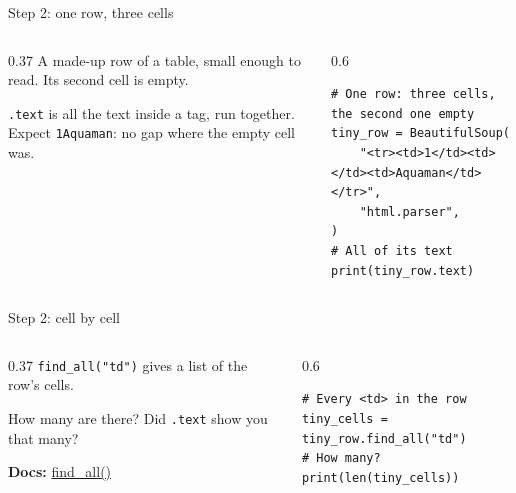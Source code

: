\documentclass[9pt,aspectratio=169]{beamer}
\begin{document}
\begin{frame}[fragile]{Step 2: one row, three cells}
    \begin{columns}[T]
        \begin{column}{0.37\textwidth}
            A made-up row of a table, small enough to read. Its second cell is empty.

            \medskip
            \texttt{.text} is all the text inside a tag, run together. Expect \texttt{1Aquaman}: no gap where the empty cell was.
        \end{column}
        \begin{column}{0.6\textwidth}
\begin{lstlisting}
# One row: three cells, the second one empty
tiny_row = BeautifulSoup(
    "<tr><td>1</td><td></td><td>Aquaman</td></tr>",
    "html.parser",
)
# All of its text
print(tiny_row.text)
\end{lstlisting}
        \end{column}
    \end{columns}
\end{frame}

\begin{frame}[fragile]{Step 2: cell by cell}
    \begin{columns}[T]
        \begin{column}{0.37\textwidth}
            \texttt{find\_all("td")} gives a list of the row's cells.

            \medskip
            How many are there? Did \texttt{.text} show you that many?

            \medskip
            {\scriptsize\textbf{Docs:} \href{https://www.crummy.com/software/BeautifulSoup/bs4/doc/\#find-all}{find\_all()}\par}
        \end{column}
        \begin{column}{0.6\textwidth}
\begin{lstlisting}
# Every <td> in the row
tiny_cells = tiny_row.find_all("td")
# How many?
print(len(tiny_cells))
\end{lstlisting}
        \end{column}
    \end{columns}
\end{frame}
\end{document}
